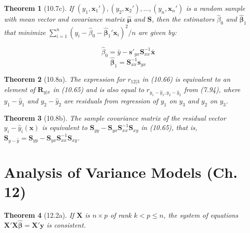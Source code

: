 \documentclass{article}
\newtheorem{theorem}{Theorem}[section]
\begin{document}
\begin{theorem}[10.7c]
If $(y_1, \mathbf{x}_1'), (y_2, \mathbf{x}_2'), \ldots, (y_n, \mathbf{x}_n')$ is a random sample with mean vector and covariance matrix $\hat{\boldsymbol{\mu}}$ and $\mathbf{S}$, then the estimators $\hat{\beta}_0$ and $\hat{\boldsymbol{\beta}}_1$ that minimize $\sum_{i=1}^n(y_i - \hat{\beta}_0 - \hat{\boldsymbol{\beta}}_1'\mathbf{x}_i)^2/n$ are given by:

\[\hat{\beta}_0 = \bar{y} - \mathbf{s}'_{yx}\mathbf{S}_{xx}^{-1}\bar{\mathbf{x}}\]
\[\hat{\boldsymbol{\beta}}_1 = \mathbf{S}_{xx}^{-1}\mathbf{s}_{yx}\]
\end{theorem}

\begin{theorem}[10.8a]
The expression for $r_{12|3}$ in (10.66) is equivalent to an element of $\mathbf{R}_{y|x}$ in (10.65) and is also equal to $r_{y_1-\hat{y}_1,y_2-\hat{y}_2}$ from (7.94), where $y_1 - \hat{y}_1$ and $y_2 - \hat{y}_2$ are residuals from regression of $y_1$ on $y_3$ and $y_2$ on $y_3$.
\end{theorem}

\begin{theorem}[10.8b]
The sample covariance matrix of the residual vector $y_i - \hat{y}_i(\mathbf{x})$ is equivalent to $\mathbf{S}_{yy} - \mathbf{S}_{yx}\mathbf{S}_{xx}^{-1}\mathbf{S}_{xy}$ in (10.65), that is, $\mathbf{S}_{y-\hat{y}} = \mathbf{S}_{yy} - \mathbf{S}_{yx}\mathbf{S}_{xx}^{-1}\mathbf{S}_{xy}$.
\end{theorem}

\section{Analysis of Variance Models (Ch. 12)}

\begin{theorem}[12.2a]
If $\mathbf{X}$ is $n \times p$ of rank $k < p \leq n$, the system of equations $\mathbf{X}'\mathbf{X}\hat{\boldsymbol{\beta}} = \mathbf{X}'\mathbf{y}$ is consistent.
\end{theorem}
\end{document}
